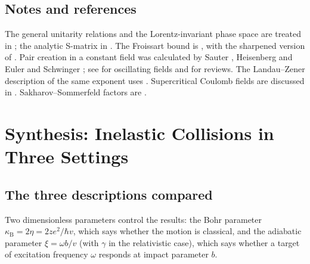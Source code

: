\documentclass[11pt,a4paper]{book}
\numberwithin{equation}{chapter}
\newcommand{\kB}{\kappa_{\mathrm B}}
\begin{document}
\section*{Notes and references}
The general unitarity relations and the Lorentz-invariant phase space are treated in \cite{Weinberg,BK,PS}; the analytic S-matrix in \cite{Eden,MartinSpearman}. The Froissart bound is \cite{Froissart61}, with the sharpened version of \cite{Martin63}. Pair creation in a constant field was calculated by Sauter \cite{Sauter31}, Heisenberg and Euler \cite{HE36} and Schwinger \cite{Schwinger51}; see \cite{Brezin70} for oscillating fields and \cite{Dunne05,GelisTanji} for reviews. The Landau--Zener description of the same exponent uses \cite{Landau32,Zener32}. Supercritical Coulomb fields are discussed in \cite{Pomeranchuk45,ZP71,Reinhardt77,Greiner}. Sakharov--Sommerfeld factors are \cite{Sakharov48,Sommerfeld31}.

\chapter{Synthesis: Inelastic Collisions in Three Settings}

\section{The three descriptions compared}

Two dimensionless parameters control the results: the Bohr parameter
$\kB=2\eta=2ze^2/\hbar v$, which says whether the motion is classical, and the
adiabatic parameter $\xi=\omega b/v$ (with $\gamma$ in the relativistic case),
which says whether a target of excitation frequency $\omega$ responds at impact
parameter $b$.
\end{document}

